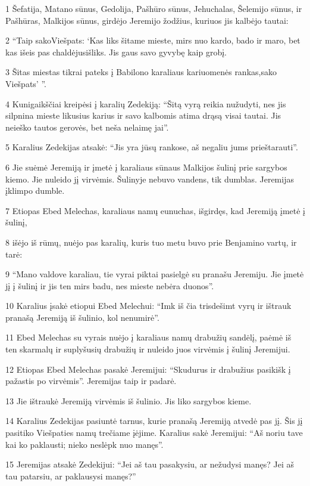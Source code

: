 \par 1 Šefatija, Matano sūnus, Gedolija, Pašhūro sūnus, Jehuchalas, Šelemijo sūnus, ir Pašhūras, Malkijos sūnus, girdėjo Jeremijo žodžius, kuriuos jis kalbėjo tautai: 
\par 2 “Taip sakoViešpats: ‘Kas liks šitame mieste, mirs nuo kardo, bado ir maro, bet kas išeis pas chaldėjus­išliks. Jis gaus savo gyvybę kaip grobį. 
\par 3 Šitas miestas tikrai pateks į Babilono karaliaus kariuomenės rankas,­sako Viešpats’ ”. 
\par 4 Kunigaikščiai kreipėsi į karalių Zedekiją: “Šitą vyrą reikia nužudyti, nes jis silpnina mieste likusius karius ir savo kalbomis atima drąsą visai tautai. Jis neieško tautos gerovės, bet neša nelaimę jai”. 
\par 5 Karalius Zedekijas atsakė: “Jis yra jūsų rankose, aš negaliu jums prieštarauti”. 
\par 6 Jie suėmė Jeremiją ir įmetė į karaliaus sūnaus Malkijos šulinį prie sargybos kiemo. Jie nuleido jį virvėmis. Šulinyje nebuvo vandens, tik dumblas. Jeremijas įklimpo dumble. 
\par 7 Etiopas Ebed Melechas, karaliaus namų eunuchas, išgirdęs, kad Jeremiją įmetė į šulinį, 
\par 8 išėjo iš rūmų, nuėjo pas karalių, kuris tuo metu buvo prie Benjamino vartų, ir tarė: 
\par 9 “Mano valdove karaliau, tie vyrai piktai pasielgė su pranašu Jeremiju. Jie įmetė jį į šulinį ir jis ten mirs badu, nes mieste nebėra duonos”. 
\par 10 Karalius įsakė etiopui Ebed Melechui: “Imk iš čia trisdešimt vyrų ir ištrauk pranašą Jeremiją iš šulinio, kol nenumirė”. 
\par 11 Ebed Melechas su vyrais nuėjo į karaliaus namų drabužių sandėlį, paėmė iš ten skarmalų ir suplyšusių drabužių ir nuleido juos virvėmis į šulinį Jeremijui. 
\par 12 Etiopas Ebed Melechas pasakė Jeremijui: “Skudurus ir drabužius pasikišk į pažastis po virvėmis”. Jeremijas taip ir padarė. 
\par 13 Jie ištraukė Jeremiją virvėmis iš šulinio. Jis liko sargybos kieme. 
\par 14 Karalius Zedekijas pasiuntė tarnus, kurie pranašą Jeremiją atvedė pas jį. Šis jį pasitiko Viešpaties namų trečiame įėjime. Karalius sakė Jeremijui: “Aš noriu tave kai ko paklausti; nieko neslėpk nuo manęs”. 
\par 15 Jeremijas atsakė Zedekijui: “Jei aš tau pasakysiu, ar nežudysi manęs? Jei aš tau patarsiu, ar paklausysi manęs?” 
